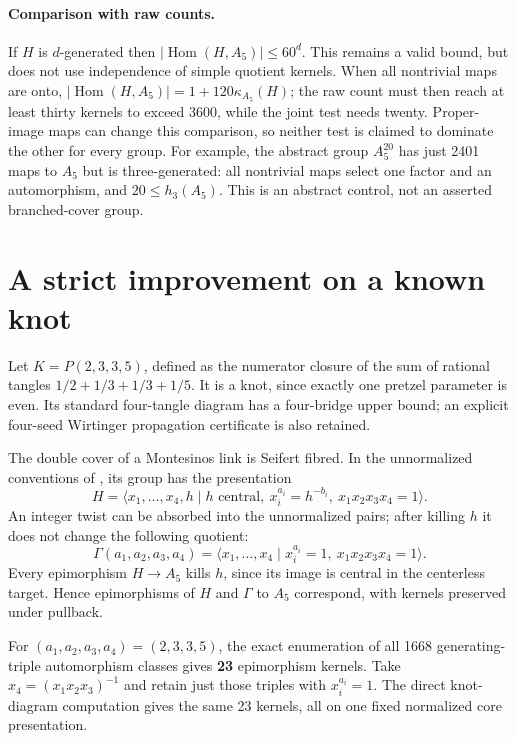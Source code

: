 \documentclass[11pt]{article}
\newcommand{\Hom}{\operatorname{Hom}}
\begin{document}
\paragraph{Comparison with raw counts.}
If $H$ is $d$-generated then $|\Hom(H,A_5)|\le60^d$. This remains a
valid bound, but does not use independence of simple quotient kernels.
When all nontrivial maps are onto, $|\Hom(H,A_5)|=1+120\kappa_{A_5}(H)$;
the raw count must then reach at least thirty kernels to exceed 3600,
while the joint test needs twenty. Proper-image maps can change this
comparison, so neither test is claimed to dominate the other for every
group. For example, the abstract group $A_5^{20}$ has just 2401 maps
to $A_5$ but is three-generated: all nontrivial maps select one factor
and an automorphism, and $20\le h_3(A_5)$. This is an abstract control,
not an asserted branched-cover group.

\section{A strict improvement on a known knot}

Let $K=P(2,3,3,5)$, defined as the numerator closure of the sum of
rational tangles $1/2+1/3+1/3+1/5$. It is a knot, since exactly one
pretzel parameter is even. Its standard four-tangle diagram has a
four-bridge upper bound; an explicit four-seed Wirtinger propagation
certificate is also retained.

The double cover of a Montesinos link is Seifert fibred. In the
unnormalized conventions of \cite[Section 7.3, p.~2671]{ps}, its group
has the presentation
\[
 H=\langle x_1,\ldots,x_4,h\mid h\text{ central},\
 x_i^{a_i}=h^{-b_i},\ x_1x_2x_3x_4=1\rangle.
\]
An integer twist can be absorbed into the unnormalized pairs; after
killing $h$ it does not change the following quotient:
\[
 \Gamma(a_1,a_2,a_3,a_4)=
 \langle x_1,\ldots,x_4\mid x_i^{a_i}=1,\ x_1x_2x_3x_4=1\rangle.
\]
Every epimorphism $H\to A_5$ kills $h$, since its image is central in
the centerless target. Hence epimorphisms of $H$ and $\Gamma$ to
$A_5$ correspond, with kernels preserved under pullback.

For $(a_1,a_2,a_3,a_4)=(2,3,3,5)$, the exact enumeration of all 1668
generating-triple automorphism classes gives \textbf{23} epimorphism
kernels. Take $x_4=(x_1x_2x_3)^{-1}$ and retain just those triples with
$x_i^{a_i}=1$. The direct knot-diagram computation gives the same
23 kernels, all on one fixed normalized core presentation.
\end{document}

